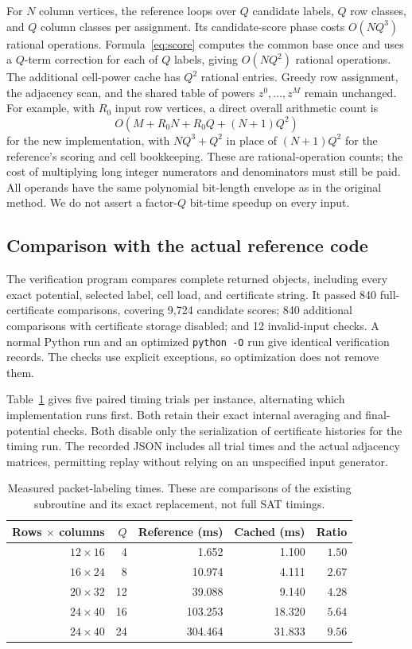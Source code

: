 For $N$ column vertices, the reference loops over $Q$ candidate labels,
$Q$ row classes, and $Q$ column classes per assignment. Its candidate-score
phase costs $O(NQ^3)$ rational operations. Formula~\eqref{eq:score} computes
the common base once and uses a $Q$-term correction for each of $Q$ labels,
giving $O(NQ^2)$ rational operations. The additional cell-power cache has
$Q^2$ rational entries. Greedy row assignment, the adjacency scan, and
the shared table of powers $z^0,\ldots,z^M$ remain unchanged. For example,
with $R_0$ input row vertices, a direct overall arithmetic count is
\[
 O(M+R_0N+R_0Q+(N+1)Q^2)
\]
for the new implementation, with $NQ^3+Q^2$ in place of $(N+1)Q^2$ for
the reference's scoring and cell bookkeeping. These are rational-operation counts;
the cost of multiplying long integer numerators and denominators must
still be paid. All operands have the same polynomial bit-length envelope
as in the original method. We do not assert a factor-$Q$ bit-time
speedup on every input.

\subsection{Comparison with the actual reference code}

The verification program compares complete returned objects, including
every exact potential, selected label, cell load, and certificate string.
It passed 840 full-certificate comparisons, covering 9,724 candidate scores;
840 additional comparisons with certificate storage disabled; and 12
invalid-input checks. A normal Python run and an optimized
\texttt{python -O} run give identical verification records. The checks use
explicit exceptions, so optimization does not remove them.

Table~\ref{tab:packing-bench} gives five paired timing trials per instance,
alternating which implementation runs first. Both retain their exact
internal averaging and final-potential checks. Both disable only the
serialization of certificate histories for the timing run. The recorded
JSON includes all trial times and the actual adjacency matrices, permitting
replay without relying on an unspecified input generator.

\begin{table}[htbp]\centering
\caption{Measured packet-labeling times. These are comparisons of the
existing subroutine and its exact replacement, not full SAT timings.}
\label{tab:packing-bench}
\begin{tabular}{@{}rrrrr@{}}\toprule
Rows $\times$ columns & $Q$ & Reference (ms) & Cached (ms) & Ratio\\\midrule
$12\times16$ & 4 & 1.652 & 1.100 & $1.50$\\
$16\times24$ & 8 & 10.974 & 4.111 & $2.67$\\
$20\times32$ & 12 & 39.088 & 9.140 & $4.28$\\
$24\times40$ & 16 & 103.253 & 18.320 & $5.64$\\
$24\times40$ & 24 & 304.464 & 31.833 & $9.56$\\\bottomrule
\end{tabular}
\end{table}

